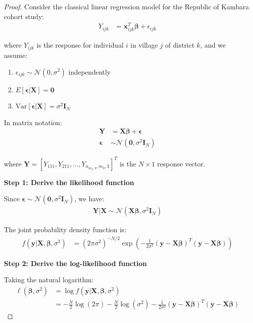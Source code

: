 \documentclass{article}
\begin{document}
\begin{proof}
Consider the classical linear regression model for the Republic of Kambara cohort study:
\begin{align}
Y_{ijk} &= \mathbf{x}_{ijk}^T\boldsymbol{\beta} + \epsilon_{ijk} \label{eq:classical_model}
\end{align}

where $Y_{ijk}$ is the response for individual $i$ in village $j$ of district $k$, and we assume:
\begin{enumerate}
    \item $\epsilon_{ijk} \sim \mathcal{N}(0, \sigma^2)$ independently
    \item $E[\boldsymbol{\epsilon}|\mathbf{X}] = \mathbf{0}$
    \item $\text{Var}[\boldsymbol{\epsilon}|\mathbf{X}] = \sigma^2\mathbf{I}_N$
\end{enumerate}

In matrix notation:
\begin{align}
\mathbf{Y} &= \mathbf{X}\boldsymbol{\beta} + \boldsymbol{\epsilon} \label{eq:matrix_model}\\
\boldsymbol{\epsilon} &\sim \mathcal{N}(\mathbf{0}, \sigma^2\mathbf{I}_N)
\end{align}

where $\mathbf{Y} = [Y_{111}, Y_{211}, \ldots, Y_{n_{m_3,3},m_3,3}]^T$ is the $N \times 1$ response vector.

\textbf{Step 1: Derive the likelihood function}

Since $\boldsymbol{\epsilon} \sim \mathcal{N}(\mathbf{0}, \sigma^2\mathbf{I}_N)$, we have:
\begin{align}
\mathbf{Y}|\mathbf{X} \sim \mathcal{N}(\mathbf{X}\boldsymbol{\beta}, \sigma^2\mathbf{I}_N)
\end{align}

The joint probability density function is:
\begin{align}
f(\mathbf{y}|\mathbf{X}, \boldsymbol{\beta}, \sigma^2) &= (2\pi\sigma^2)^{-N/2} \exp\left(-\frac{1}{2\sigma^2}(\mathbf{y} - \mathbf{X}\boldsymbol{\beta})^T(\mathbf{y} - \mathbf{X}\boldsymbol{\beta})\right)
\end{align}

\textbf{Step 2: Derive the log-likelihood function}

Taking the natural logarithm:
\begin{align}
\ell(\boldsymbol{\beta}, \sigma^2) &= \log f(\mathbf{y}|\mathbf{X}, \boldsymbol{\beta}, \sigma^2) \nonumber\\
&= -\frac{N}{2}\log(2\pi) - \frac{N}{2}\log(\sigma^2) - \frac{1}{2\sigma^2}(\mathbf{y} - \mathbf{X}\boldsymbol{\beta})^T(\mathbf{y} - \mathbf{X}\boldsymbol{\beta}) \label{eq:loglik}
\end{align}


\end{proof}
\end{document}
